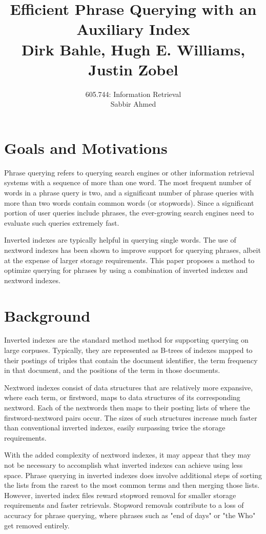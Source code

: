 \documentclass[11pt]{article}
\title{\vspace{-2.5cm} Efficient Phrase Querying with an Auxiliary Index \\ Dirk Bahle, Hugh E. Williams, Justin Zobel}
\author{605.744: Information Retrieval \\ Sabbir Ahmed}
\date{\vspace{-1cm}}
\begin{document}
\maketitle

    \section*{Goals and Motivations}

    Phrase querying refers to querying search engines or other information retrieval systems with a sequence of more than one word. The most frequent number of words in a phrase query is two, and a significant number of phrase queries with more than two words contain common words (or stopwords). Since a significant portion of user queries include phrases, the ever-growing search engines need to evaluate such queries extremely fast.

    Inverted indexes are typically helpful in querying single words. The use of nextword indexes has been shown to improve support for querying phrases, albeit at the expense of larger storage requirements. This paper proposes a method to optimize querying for phrases by using a combination of inverted indexes and nextword indexes.

    \section*{Background}

    Inverted indexes are the standard method method for supporting querying on large corpuses. Typically, they are represented as B-trees of indexes mapped to their postings of triples that contain the document identifier, the term frequency in that document, and the positions of the term in those documents.

    Nextword indexes consist of data structures that are relatively more expansive, where each term, or firstword, maps to data structures of its corresponding nextword. Each of the nextwords then maps to their posting lists of where the firstword-nextword pairs occur. The sizes of such structures increase much faster than conventional inverted indexes, easily surpassing twice the storage requirements.

    With the added complexity of nextword indexes, it may appear that they may not be necessary to accomplish what inverted indexes can achieve using less space. Phrase querying in inverted indexes does involve additional steps of sorting the lists from the rarest to the most common terms and then merging those lists. However, inverted index files reward stopword removal for smaller storage requirements and faster retrievals. Stopword removals contribute to a loss of accuracy for phrase querying, where phrases such as "end of days" or "the Who" get removed entirely.
\end{document}
